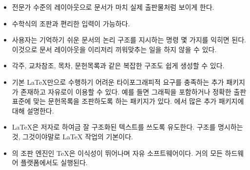 \begin{itemize} \oblivoirlist
\item 전문가 수준의 레이아웃으로 문서가 마치 실제 출판물처럼 보이게 한다.
\item 수학식의 조판과 편리한 입력이 가능하다.
\item 사용자는 기억하기 쉬운 문서의 논리 구조를 지시하는 명령 몇 가지를 익히면 된다. 이것으로 문서 레이아웃을 이리저리 끼워맞추는 일을 하지 않을 수 있다.
\item 각주, 교차참조, 목차, 문헌목록과 같은 복잡한 구조도 쉽게 생성할 수 있다.
\item 기본 \LaTeX 만으로 수행하기 어려운 타이포그래피적 요구를 충족하는 추가 패키지가 존재하고 자유로이 이용할 수 있다. 예를 들면 \PSi{} 그래픽을 포함하거나 정확한 출판 표준에 맞는 문헌목록을 조판하도록 하는 패키지가 있다. \companion 에서 많은 추가 패키지에 대해 설명한다.
\item \LaTeX 은 저자로 하여금 잘 구조화된 텍스트를 쓰도록 유도한다. 구조를 명시하는 것, 그것이야말로 \LaTeX{}  작업의 기본이다.
\item \LaTeXe 의 조판 엔진인 \TeX 은 이식성이 뛰어나며 자유 소프트웨어이다. 거의 모든 하드웨어 플랫폼에서도 실행된다.

\end{itemize}

